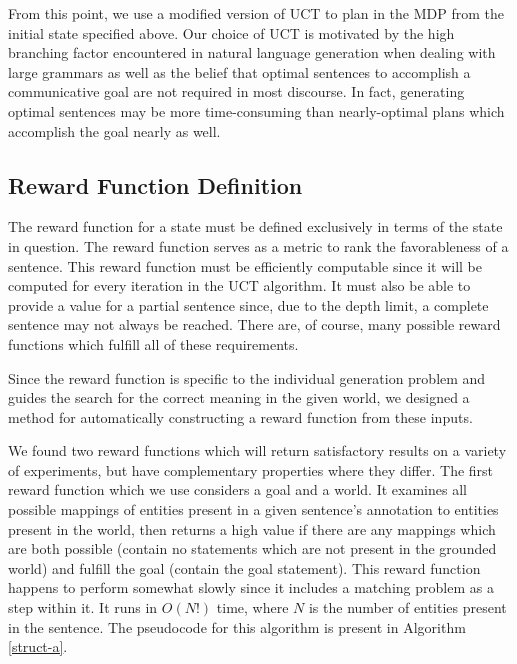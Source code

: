 From this point, we use a modified version of UCT
to plan in the MDP from the initial state specified above. 
Our choice of UCT is motivated by the high branching factor encountered in natural language generation when dealing with
large grammars as well as the belief that optimal sentences to accomplish a communicative goal are not required in most
discourse. In fact, generating optimal sentences may be more time-consuming than nearly-optimal plans which accomplish
the goal nearly as well.

\subsection{Reward Function Definition}

 The reward function for a state must be defined exclusively in terms
 of the state in question.  The reward function serves as a metric to
 rank the favorableness of a sentence.  This reward function must be
 efficiently computable since it will be computed for every iteration
 in the UCT algorithm.  It must also be able to provide a value for a
 partial sentence since, due to the depth limit, a complete sentence
 may not always be reached.  There are, of course, many
possible reward functions which fulfill all of these requirements.

Since the reward function is specific to the individual generation
problem and guides the search for the correct meaning in the
given world, we designed a method for automatically constructing
a reward function from these inputs.
 
We found two reward functions which will
 return satisfactory results on a variety of experiments, but have complementary
properties where they differ.  The first reward function
 which we use considers a goal and a
 world.  It examines all possible mappings of entities present in
 a given sentence's annotation to entities present in the world, then returns
 a high value if there are any mappings which are both possible (contain no statements
 which are not present in the grounded world) and fulfill the goal (contain the
 goal statement).  This reward function happens to perform somewhat slowly since it includes
a matching problem as a step within it.  It runs in $O(N!)$ time, where
$N$ is the number of entities present in the sentence.  The pseudocode for this algorithm
is present in Algorithm \ref{struct-a}.

